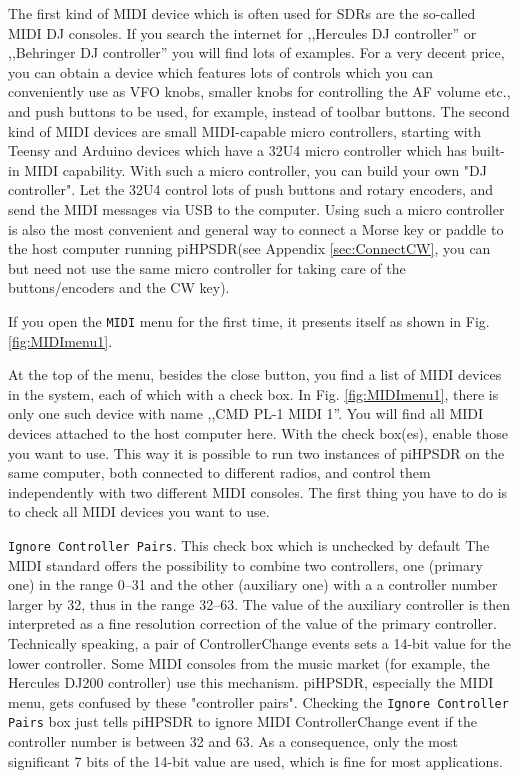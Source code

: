 \documentclass[12pt]{book}
\def\rett#1{\texttt{\color{red}#1}}
\def\bltt#1{\texttt{\color{blue}#1}}
\def\pH{pi\-HPSDR\xspace}
\begin{document}
The first kind of MIDI device which is often used for SDRs are the so-called MIDI DJ
consoles. If you search the internet for ,,Hercules DJ controller'' or ,,Behringer
DJ controller'' you will find lots of examples. For a very decent price, you
can obtain a device which features lots of controls which you can conveniently use
as VFO knobs, smaller knobs for controlling the AF volume etc., and push buttons
to be used, for example, instead of toolbar buttons. The second kind of MIDI devices
are small MIDI-capable micro controllers, starting with Teensy and Arduino devices
which have a 32U4 micro controller which has built-in MIDI capability. With such a
micro controller, you can build your own "DJ controller". Let the 32U4 control
lots of push buttons and rotary encoders, and send the MIDI messages via USB to the
computer. Using such a micro controller is also the most convenient and general way
to connect a Morse key or paddle to the host computer running \pH (see
Appendix \ref{sec:ConnectCW}, you can but need not use the same micro controller
for taking care of the buttons/encoders and the CW key).

If you open the \bltt{MIDI} menu for the first time, it presents itself as shown
in Fig. \ref{fig:MIDImenu1}.



At the top of the menu, besides the close button, you find a list of MIDI devices
in the system, each of which with a check box. In Fig. \ref{fig:MIDImenu1}, there is only
one such device with name ,,CMD PL-1 MIDI 1''. You will find all MIDI devices attached
to the host computer here. With the check box(es), enable those you want to use.
This way it is possible to run two instances of \pH on the same computer, both
connected to different radios, and control them independently with two different MIDI
consoles. The first thing you have to do is to check all MIDI devices you want to use.

\rett{Ignore Controller Pairs}. This check box  which is unchecked by default
The MIDI standard offers the possibility to combine two controllers, one
(primary one) in the range 0--31 and the other (auxiliary one)
with a a controller number larger by 32, thus in
the range 32--63. The value of the auxiliary controller is then interpreted as a
fine resolution correction of the value of the primary controller. Technically
speaking,
a pair of ControllerChange events sets a 14-bit value for the lower controller.
Some MIDI consoles
from the music market (for example, the Hercules DJ200 controller)
use this mechanism. \pH, especially the MIDI menu, gets confused
by these "controller pairs". Checking the \rett{Ignore Controller Pairs} box just tells
\pH to ignore MIDI ControllerChange event if the controller number is between 32 and 63.
As a consequence, only the most significant 7 bits of the 14-bit value are used, which
is fine for most applications.
\end{document}
